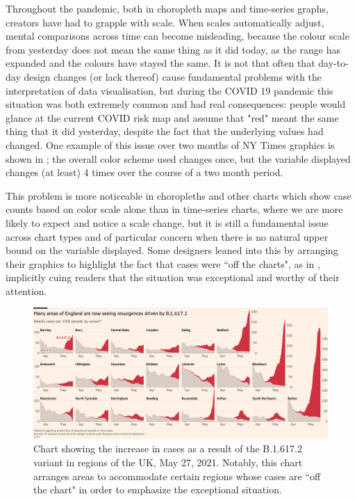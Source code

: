 \documentclass[article]{jdssv}\usepackage[]{graphicx}\usepackage[]{xcolor}
\begin{document}
Throughout the pandemic, both in choropleth maps and time-series graphs, creators have had to grapple with scale. When scales automatically adjust, mental comparisons across time can become misleading, because the colour scale from yesterday does not mean the same thing as it did today, as the range has expanded and the colours have stayed the same. 
It is not that often that day-to-day design changes (or lack thereof) cause fundamental problems with the interpretation of data visualisation, but during the COVID 19 pandemic this situation was both extremely common and had real consequences: people would glance at the current COVID risk map and assume that "red" meant the same thing that it did yesterday, despite the fact that the underlying values had changed\citep{abiadColorDiagramWHOLebanon2020,rubelHeyUpshotNYTCurious2020,matthewsLessonFutzingData2020}. 
One example of this issue over two months of NY Times graphics is shown in ; the overall color scheme used changes once, but the variable displayed changes (at least) 4 times over the course of a two month period. 


This problem is more noticeable in choropleths and other charts which show case counts based on color scale alone than in time-series charts, where we are more likely to expect and notice a scale change, but it is still a fundamental issue across chart types and of particular concern when there is no natural upper bound on the variable displayed. 
Some designers leaned into this by arranging their graphics to highlight the fact that cases were ``off the charts", as in , implicitly cuing readers that the situation was exceptional and worthy of their attention.

\begin{figure}
\includegraphics[width=.99\linewidth]{ft-off-charts}
\caption{Chart showing the increase in cases as a result of the B.1.617.2 variant in regions of the UK, May 27, 2021. Notably, this chart arranges areas to accommodate certain regions whose cases are ``off the chart" in order to emphasize the exceptional situation. \citep{burn-murdochNEW1617Fuelling2021}}
\label{fig:jbm-tweet}
\end{figure}
\end{document}
